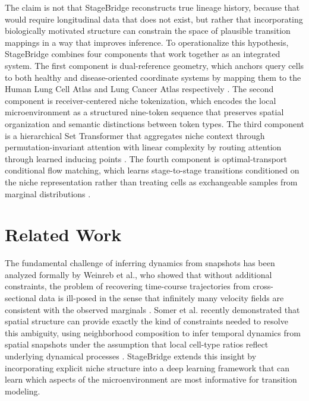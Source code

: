 \documentclass[conference]{IEEEtran}
\begin{document}
The claim is not that StageBridge reconstructs true lineage history, because that would require longitudinal data that does not exist, but rather that incorporating biologically motivated structure can constrain the space of plausible transition mappings in a way that improves inference. To operationalize this hypothesis, StageBridge combines four components that work together as an integrated system. The first component is dual-reference geometry, which anchors query cells to both healthy and disease-oriented coordinate systems by mapping them to the Human Lung Cell Atlas and Lung Cancer Atlas respectively \cite{Sikkema2023-dr,Salcher2022-pu}. The second component is receiver-centered niche tokenization, which encodes the local microenvironment as a structured nine-token sequence that preserves spatial organization and semantic distinctions between token types. The third component is a hierarchical Set Transformer that aggregates niche context through permutation-invariant attention with linear complexity by routing attention through learned inducing points \cite{Lee2018-ya}. The fourth component is optimal-transport conditional flow matching, which learns stage-to-stage transitions conditioned on the niche representation rather than treating cells as exchangeable samples from marginal distributions \cite{Lipman2022-ns,Cuturi2013-li}.

\section{Related Work}

The fundamental challenge of inferring dynamics from snapshots has been analyzed formally by Weinreb et al., who showed that without additional constraints, the problem of recovering time-course trajectories from cross-sectional data is ill-posed in the sense that infinitely many velocity fields are consistent with the observed marginals \cite{Weinreb2018-jq}. Somer et al. recently demonstrated that spatial structure can provide exactly the kind of constraints needed to resolve this ambiguity, using neighborhood composition to infer temporal dynamics from spatial snapshots under the assumption that local cell-type ratios reflect underlying dynamical processes \cite{Somer2026-ma}. StageBridge extends this insight by incorporating explicit niche structure into a deep learning framework that can learn which aspects of the microenvironment are most informative for transition modeling.
\end{document}
